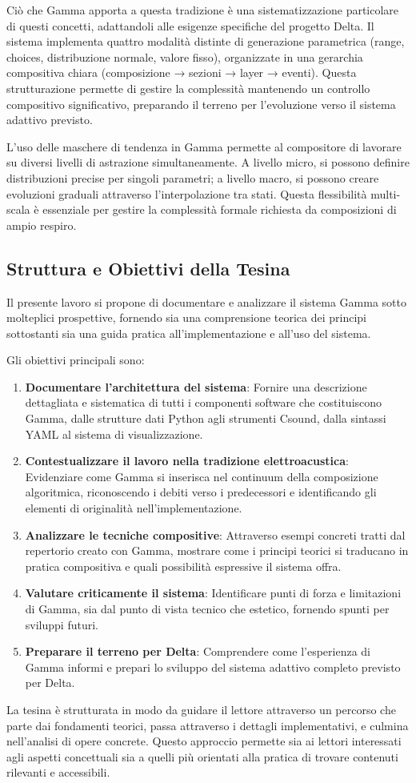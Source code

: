 Ciò che Gamma apporta a questa tradizione è una sistematizzazione particolare di questi concetti, adattandoli alle esigenze specifiche del progetto Delta. Il sistema implementa quattro modalità distinte di generazione parametrica (range, choices, distribuzione normale, valore fisso), organizzate in una gerarchia compositiva chiara (composizione → sezioni → layer → eventi). Questa strutturazione permette di gestire la complessità mantenendo un controllo compositivo significativo, preparando il terreno per l'evoluzione verso il sistema adattivo previsto.

L'uso delle maschere di tendenza in Gamma permette al compositore di lavorare su diversi livelli di astrazione simultaneamente. A livello micro, si possono definire distribuzioni precise per singoli parametri; a livello macro, si possono creare evoluzioni graduali attraverso l'interpolazione tra stati. Questa flessibilità multi-scala è essenziale per gestire la complessità formale richiesta da composizioni di ampio respiro.
\subsection{Struttura e Obiettivi della Tesina}
Il presente lavoro si propone di documentare e analizzare il sistema Gamma sotto molteplici prospettive, fornendo sia una comprensione teorica dei principi sottostanti sia una guida pratica all'implementazione e all'uso del sistema.

Gli obiettivi principali sono:

\begin{enumerate}
    \item \textbf{Documentare l'architettura del sistema}: Fornire una descrizione dettagliata e sistematica di tutti i componenti software che costituiscono Gamma, dalle strutture dati Python agli strumenti Csound, dalla sintassi YAML al sistema di visualizzazione.
    \item \textbf{Contestualizzare il lavoro nella tradizione elettroacustica}: Evidenziare come Gamma si inserisca nel continuum della composizione algoritmica, riconoscendo i debiti verso i predecessori e identificando gli elementi di originalità nell'implementazione.
    \item \textbf{Analizzare le tecniche compositive}: Attraverso esempi concreti tratti dal repertorio creato con Gamma, mostrare come i principi teorici si traducano in pratica compositiva e quali possibilità espressive il sistema offra.
    \item \textbf{Valutare criticamente il sistema}: Identificare punti di forza e limitazioni di Gamma, sia dal punto di vista tecnico che estetico, fornendo spunti per sviluppi futuri.
    \item \textbf{Preparare il terreno per Delta}: Comprendere come l'esperienza di Gamma informi e prepari lo sviluppo del sistema adattivo completo previsto per Delta.
\end{enumerate}
La tesina è strutturata in modo da guidare il lettore attraverso un percorso che parte dai fondamenti teorici, passa attraverso i dettagli implementativi, e culmina nell'analisi di opere concrete. Questo approccio permette sia ai lettori interessati agli aspetti concettuali sia a quelli più orientati alla pratica di trovare contenuti rilevanti e accessibili.